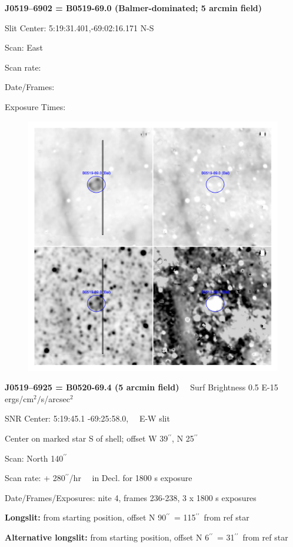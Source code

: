 \documentclass[11pt]{article}
\newcommand{\arcsec}{$^{\prime\prime}$}
\begin{document}
\newpage
{\bf J0519--6902 = B0519-69.0 (Balmer-dominated; 5 arcmin field)}  
 
Slit Center:   5:19:31.401,-69:02:16.171 N-S

Scan:  East

Scan rate:  

Date/Frames:

Exposure Times:  

\begin{figure}
\includegraphics[width=11.cm]{snapshots/B0519-690_5arcmin.png}
\end{figure}

\newpage
{\bf J0519--6925 = B0520-69.4 (5 arcmin field)}  \ \ Surf Brightness 0.5 E-15 ergs/cm$^2/$s/arcsec$^2$
 
SNR Center:   5:19:45.1  -69:25:58.0, \ \  E-W slit 

Center on marked star S of shell; offset W 39\arcsec, N 25\arcsec

Scan:  North 140\arcsec

Scan rate:  + 280\arcsec/hr \ \ in Decl.  for 1800 s exposure

Date/Frames/Exposures:  nite 4, frames 236-238,   3 x 1800 s exposures

\vspace{0.20in}
{\bf Longslit:}  from starting position, offset N 90\arcsec\ = 115\arcsec\ from ref star

{\bf Alternative longslit:}  from starting position, offset N 6\arcsec\ = 31\arcsec\ from ref star
\end{document}
